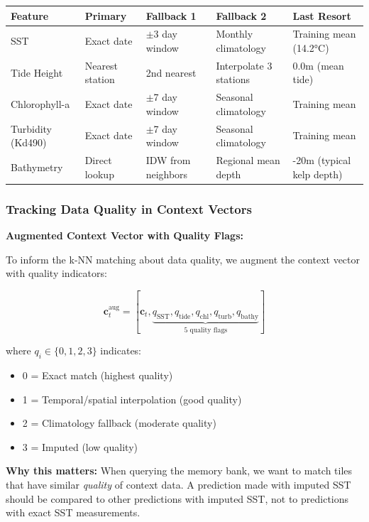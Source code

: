 \documentclass[11pt]{article}
\begin{document}
\begin{center}
\small
\begin{tabular}{p{2.5cm}p{2cm}p{2cm}p{2cm}p{3cm}}
\toprule
\textbf{Feature} & \textbf{Primary} & \textbf{Fallback 1} & \textbf{Fallback 2} & \textbf{Last Resort} \\
\midrule
SST & Exact date & $\pm$3 day window & Monthly climatology & Training mean (14.2°C) \\
\addlinespace
Tide Height & Nearest station & 2nd nearest & Interpolate 3 stations & 0.0m (mean tide) \\
\addlinespace
Chlorophyll-a & Exact date & $\pm$7 day window & Seasonal climatology & Training mean \\
\addlinespace
Turbidity (Kd490) & Exact date & $\pm$7 day window & Seasonal climatology & Training mean \\
\addlinespace
Bathymetry & Direct lookup & IDW from neighbors & Regional mean depth & -20m (typical kelp depth) \\
\bottomrule
\end{tabular}
\end{center}

\subsubsection{Tracking Data Quality in Context Vectors}

\textbf{Augmented Context Vector with Quality Flags:}

To inform the k-NN matching about data quality, we augment the context vector with quality indicators:

\[
\mathbf{c}_t^{\text{aug}} = [\mathbf{c}_t, \underbrace{q_{\text{SST}}, q_{\text{tide}}, q_{\text{chl}}, q_{\text{turb}}, q_{\text{bathy}}}_{\text{5 quality flags}}]
\]

where $q_i \in \{0, 1, 2, 3\}$ indicates:
\begin{itemize}
    \item 0 = Exact match (highest quality)
    \item 1 = Temporal/spatial interpolation (good quality)
    \item 2 = Climatology fallback (moderate quality)
    \item 3 = Imputed (low quality)
\end{itemize}

\textbf{Why this matters:} When querying the memory bank, we want to match tiles that have similar \textit{quality} of context data. A prediction made with imputed SST should be compared to other predictions with imputed SST, not to predictions with exact SST measurements.
\end{document}
